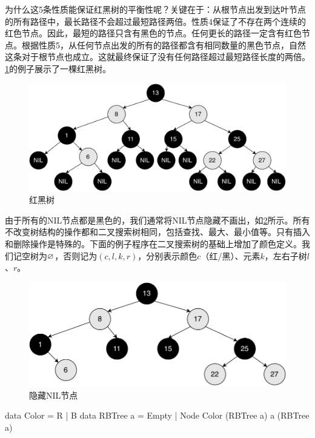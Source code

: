 \documentclass[b5paper]{ctexart}
\begin{document}
为什么这5条性质能保证红黑树的平衡性呢？关键在于：从根节点出发到达叶节点的所有路径中，最长路径不会超过最短路径两倍。性质4保证了不存在两个连续的红色节点。因此，最短的路径只含有黑色的节点。任何更长的路径一定含有红色节点。根据性质5，从任何节点出发的所有的路径都含有相同数量的黑色节点，自然这条对于根节点也成立。这就最终保证了没有任何路径超过最短路径长度的两倍\cite{wiki-rbt}。\cref{fig:rbt-example-with-nil}的例子展示了一棵红黑树。

\begin{figure}[htbp]
  \centering
  \includegraphics[scale=0.5]{img/rbt-example-with-nil}
  \caption{红黑树}
  \label{fig:rbt-example-with-nil}
\end{figure}

由于所有的NIL节点都是黑色的，我们通常将NIL节点隐藏不画出，如\cref{fig:rbt-example}所示。所有不改变树结构的操作都和二叉搜索树相同，包括查找、最大、最小值等。只有插入和删除操作是特殊的。下面的例子程序在二叉搜索树的基础上增加了颜色定义。我们记空树为$\varnothing$，否则记为$(c, l, k, r)$，分别表示颜色$c$（红/黑）、元素$k$，左右子树$l$、$r$。

\begin{figure}[htbp]
  \centering
  \includegraphics[scale=0.5]{img/rbt-example}
  \caption{隐藏NIL节点}
  \label{fig:rbt-example}
\end{figure}

\begin{Haskell}
data Color = R | B
data RBTree a = Empty | Node Color (RBTree a) a (RBTree a)
\end{Haskell}
\end{document}
